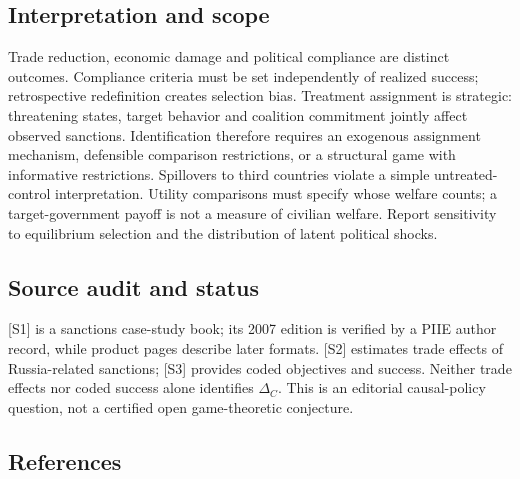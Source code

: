 \documentclass[11pt,a4paper]{article}
\begin{document}
\subsection*{Interpretation and scope}
Trade reduction, economic damage and political compliance are distinct outcomes. Compliance criteria must be set independently of realized success; retrospective redefinition creates selection bias. Treatment assignment is strategic: threatening states, target behavior and coalition commitment jointly affect observed sanctions. Identification therefore requires an exogenous assignment mechanism, defensible comparison restrictions, or a structural game with informative restrictions. Spillovers to third countries violate a simple untreated-control interpretation. Utility comparisons must specify whose welfare counts; a target-government payoff is not a measure of civilian welfare. Report sensitivity to equilibrium selection and the distribution of latent political shocks.

\subsection*{Source audit and status}
[S1] is a sanctions case-study book; its 2007 edition is verified by a PIIE author record, while product pages describe later formats. [S2] estimates trade effects of Russia-related sanctions; [S3] provides coded objectives and success. Neither trade effects nor coded success alone identifies $\Delta_C$. This is an editorial causal-policy question, not a certified open game-theoretic conjecture.

\subsection*{References}
\end{document}

